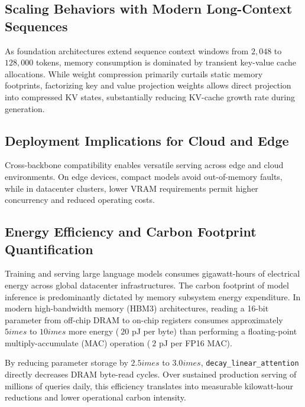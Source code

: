 \subsection{Scaling Behaviors with Modern Long-Context Sequences}
As foundation architectures extend sequence context windows from $2{,}048$ to $128{,}000$ tokens, memory consumption is dominated by transient key-value cache allocations. While weight compression primarily curtails static memory footprints, factorizing key and value projection weights allows direct projection into compressed KV states, substantially reducing KV-cache growth rate during generation.

\subsection{Deployment Implications for Cloud and Edge}
Cross-backbone compatibility enables versatile serving across edge and cloud environments. On edge devices, compact models avoid out-of-memory faults, while in datacenter clusters, lower VRAM requirements permit higher concurrency and reduced operating costs.

\subsection{Energy Efficiency and Carbon Footprint Quantification}
Training and serving large language models consumes gigawatt-hours of electrical energy across global datacenter infrastructures. The carbon footprint of model inference is predominantly dictated by memory subsystem energy expenditure. In modern high-bandwidth memory (HBM3) architectures, reading a 16-bit parameter from off-chip DRAM to on-chip registers consumes approximately $5	imes$ to $10	imes$ more energy ($~20$ pJ per byte) than performing a floating-point multiply-accumulate (MAC) operation ($~2$ pJ per FP16 MAC).

By reducing parameter storage by $2.5	imes$ to $3.0	imes$, \texttt{decay\_linear\_attention} directly decreases DRAM byte-read cycles. Over sustained production serving of millions of queries daily, this efficiency translates into measurable kilowatt-hour reductions and lower operational carbon intensity.
